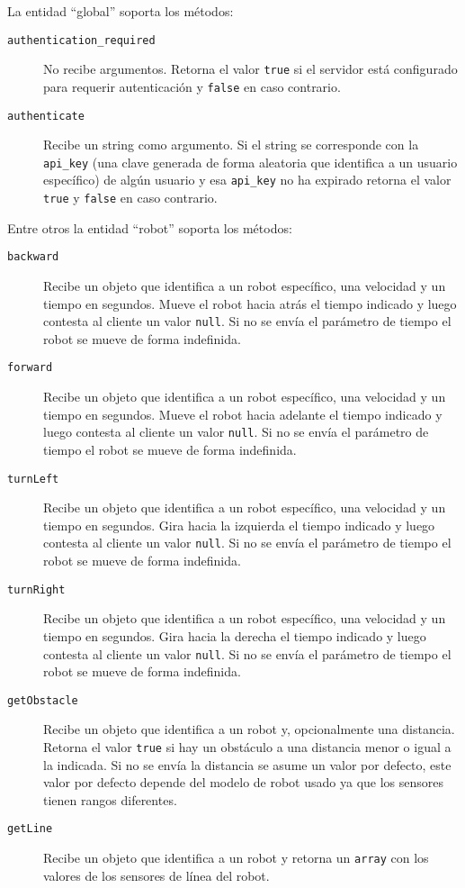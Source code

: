 La entidad ``global'' soporta los métodos:
\begin{description}
    \item[\texttt{authentication\_required}] No recibe argumentos. Retorna el valor 
        \texttt{true} si el servidor está configurado para requerir
        autenticación y \texttt{false} en caso contrario.
    \item[\texttt{authenticate}] Recibe un string como argumento. Si el string se corresponde
        con la \texttt{api\_key} (una clave generada de forma aleatoria que identifica
        a un usuario específico) de algún usuario
        y esa \texttt{api\_key}  no
        ha expirado retorna el valor \texttt{true} y \texttt{false} en caso contrario.
\end{description}

Entre otros la entidad ``robot'' soporta los métodos:
\begin{description}
    \item[\texttt{backward}] Recibe un objeto que identifica a un robot
        específico, una velocidad y un tiempo en segundos. Mueve el robot hacia
        atrás el tiempo indicado y luego contesta al cliente un valor \texttt{null}.
        Si no se envía el parámetro de tiempo el robot se mueve
        de forma indefinida.
    \item[\texttt{forward}] Recibe un objeto que identifica a un robot
        específico, una velocidad y un tiempo en segundos. Mueve el robot hacia
        adelante el tiempo indicado y luego contesta al cliente un valor \texttt{null}.
        Si no se envía el parámetro de tiempo el robot se mueve
        de forma indefinida.
    \item[\texttt{turnLeft}] Recibe un objeto que identifica a un robot
        específico, una velocidad y un tiempo en segundos. Gira hacia
        la izquierda el tiempo indicado y luego contesta al cliente un valor \texttt{null}.
        Si no se envía el parámetro de tiempo el robot se mueve
        de forma indefinida.
    \item[\texttt{turnRight}] Recibe un objeto que identifica a un robot
        específico, una velocidad y un tiempo en segundos. Gira hacia
        la derecha el tiempo indicado y luego contesta al cliente un valor \texttt{null}.
        Si no se envía el parámetro de tiempo el robot se mueve
        de forma indefinida.
    \item[\texttt{getObstacle}] Recibe un objeto que identifica a un robot y,
        opcionalmente una distancia. Retorna el valor 
        \texttt{true} si hay un obstáculo a una distancia menor o igual a la
        indicada. Si no se envía la distancia se asume un valor por defecto,
        este valor por defecto depende del modelo de robot usado ya que los
        sensores tienen rangos diferentes.
    \item[\texttt{getLine}] Recibe un objeto que identifica a un robot y
        retorna un \texttt{array}
        con los valores de los sensores de línea del robot.
\end{description}


